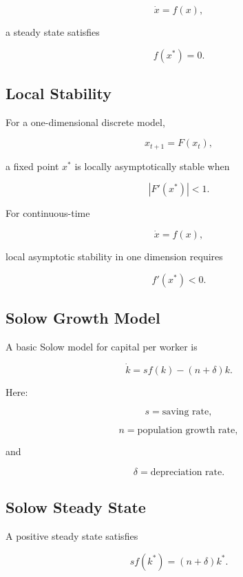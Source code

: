 \[
\dot{x}
=
f(x),
\]

a steady state satisfies

\[
\boxed{
f(x^*)=0.
}
\]

\subsection{Local Stability}
\label{subsec:economic-local-stability}

For a one-dimensional discrete model,

\[
x_{t+1}
=
F(x_t),
\]

a fixed point \(x^*\) is locally asymptotically stable when

\[
\boxed{
|F'(x^*)|<1.
}
\]

For continuous-time

\[
\dot{x}=f(x),
\]

local asymptotic stability in one dimension requires

\[
\boxed{
f'(x^*)<0.
}
\]

\subsection{Solow Growth Model}
\label{subsec:solow-growth-model}

A basic Solow model for capital per worker is

\[
\boxed{
\dot{k}
=
sf(k)
-
(n+\delta)k.
}
\]

Here:

\[
s
=
\text{saving rate},
\]

\[
n
=
\text{population growth rate},
\]

and

\[
\delta
=
\text{depreciation rate}.
\]

\subsection{Solow Steady State}
\label{subsec:solow-steady-state}

A positive steady state satisfies

\[
\boxed{
sf(k^*)
=
(n+\delta)k^*.
}
\]


